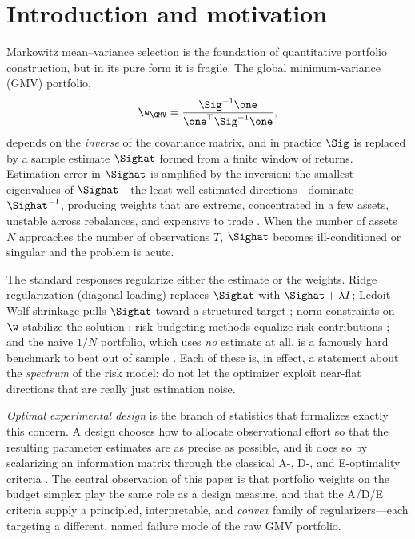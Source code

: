 \section{Introduction and motivation}

Markowitz mean--variance selection \cite{markowitz1952} is the foundation of
quantitative portfolio construction, but in its pure form it is fragile. The
global minimum-variance (GMV) portfolio,
\[
  \w_{\GMV}=\frac{\Sig^{-1}\one}{\one^\top\Sig^{-1}\one},
\]
depends on the \emph{inverse} of the covariance matrix, and in practice $\Sig$ is
replaced by a sample estimate $\Sighat$ formed from a finite window of returns.
Estimation error in $\Sighat$ is amplified by the inversion: the smallest
eigenvalues of $\Sighat$---the least well-estimated directions---dominate
$\Sighat^{-1}$, producing weights that are extreme, concentrated in a few
assets, unstable across rebalances, and expensive to trade
\cite{brittenjones1999}. When the number of assets $N$ approaches the number of
observations $T$, $\Sighat$ becomes ill-conditioned or singular and the problem
is acute.

The standard responses regularize either the estimate or the weights. Ridge
regularization (diagonal loading) replaces $\Sighat$ with $\Sighat+\lambda I$;
Ledoit--Wolf shrinkage pulls $\Sighat$ toward a structured target
\cite{ledoitwolf2004}; norm constraints on $\w$ stabilize the solution
\cite{demiguel2009norm,brodie2009}; risk-budgeting methods equalize risk
contributions \cite{maillard2010}; and the naive $1/N$ portfolio, which uses
\emph{no} estimate at all, is a famously hard benchmark to beat out of sample
\cite{demiguel2009}. Each of these is, in effect, a statement about the
\emph{spectrum} of the risk model: do not let the optimizer exploit near-flat
directions that are really just estimation noise.

\emph{Optimal experimental design} is the branch of statistics that formalizes
exactly this concern. A design chooses how to allocate observational effort so
that the resulting parameter estimates are as precise as possible, and it does so
by scalarizing an information matrix through the classical A-, D-, and
E-optimality criteria \cite{bergerwong,pukelsheim2006,kiefer1960}. The central
observation of this paper is that portfolio weights on the budget simplex play
the same role as a design measure, and that the A/D/E criteria supply a
principled, interpretable, and \emph{convex} family of regularizers---each
targeting a different, named failure mode of the raw GMV portfolio.

